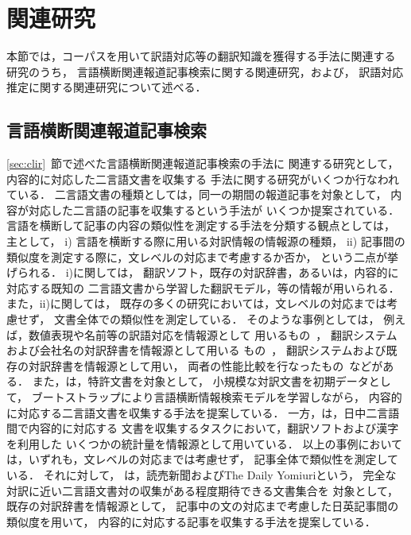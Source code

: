 \section{関連研究}
\label{sec:related}

本節では，コーパスを用いて訳語対応等の翻訳知識を獲得する手法に関連する
研究のうち，
言語横断関連報道記事検索に関する関連研究，および，
訳語対応推定に関する関連研究について述べる．

\subsection{言語横断関連報道記事検索}

\ref{sec:clir}~節で述べた言語横断関連報道記事検索の手法に
関連する研究として，内容的に対応した二言語文書を収集する
手法に関する研究がいくつか行なわれている．
二言語文書の種類としては，同一の期間の報道記事を対象として，
内容が対応した二言語の記事を収集するという手法が
いくつか提案されている．
言語を横断して記事の内容の類似性を測定する手法を分類する観点としては，
主として，
i) 言語を横断する際に用いる対訳情報の情報源の種類，
ii) 記事間の類似度を測定する際に，文レベルの対応まで考慮するか否か，
という二点が挙げられる．
i)に関しては，
翻訳ソフト，既存の対訳辞書，あるいは，内容的に対応する既知の
二言語文書から学習した翻訳モデル，等の情報が用いられる．
また，ii)に関しては，
既存の多くの研究においては，文レベルの対応までは考慮せず，
文書全体での類似性を測定している．
そのような事例としては，
例えば，数値表現や名前等の訳語対応を情報源として
用いるもの~\cite{Takahashi97a,Xu99a}，
翻訳システムおよび会社名の対訳辞書を情報源として用いる
もの~\cite{KMatsumoto02a}，
翻訳システムおよび既存の対訳辞書を情報源として用い，
両者の性能比較を行なったもの~\cite{Collier98a}などがある．
また，\cite{Masuichi00a}は，特許文書を対象として，
小規模な対訳文書を初期データとして，
ブートストラップにより言語横断情報検索モデルを学習しながら，
内容的に対応する二言語文書を収集する手法を提案している．
一方，\cite{Hasan01a}は，日中二言語間で内容的に対応する
文書を収集するタスクにおいて，翻訳ソフトおよび漢字を利用した
いくつかの統計量を情報源として用いている．
以上の事例においては，いずれも，文レベルの対応までは考慮せず，
記事全体で類似性を測定している．
それに対して，
\cite{Uchiyama03aj}は，読売新聞およびThe Daily Yomiuriという，
完全な対訳に近い二言語文書対の収集がある程度期待できる文書集合を
対象として，既存の対訳辞書を情報源として，
記事中の文の対応まで考慮した日英記事間の類似度を用いて，
内容的に対応する記事を収集する手法を提案している．

